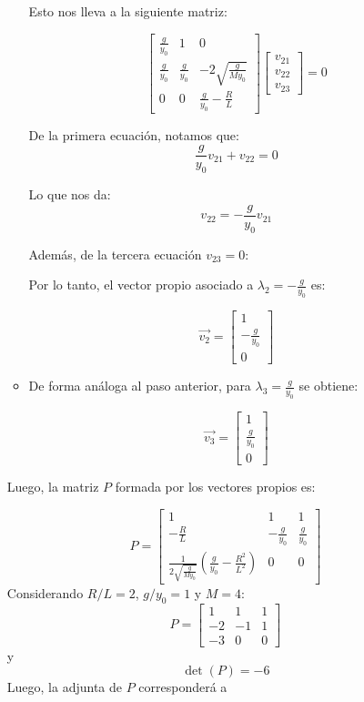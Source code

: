 \begin{enumerate}
\begin{itemize}
Esto nos lleva a la siguiente matriz:

\[
\begin{bmatrix}
\frac{g}{y_0} & 1 & 0 \\
\frac{g}{y_0} & \frac{g}{y_0} & -2\sqrt{\frac{g}{M y_0}} \\
0 & 0 & \frac{g}{y_0} - \frac{R}{L}
\end{bmatrix}
\begin{bmatrix}
v_{21} \\
v_{22} \\
v_{23}
\end{bmatrix}
= 0
\]

De la primera ecuación, notamos que:
\[ \frac{g}{y_0} v_{21} + v_{22} = 0 \]

Lo que nos da:
   \[
   v_{22} = -\frac{g}{y_0} v_{21}
   \]
   
   Además, de la tercera ecuación \(
   v_{23} = 0
   \):
   \[\]

Por lo tanto, el vector propio asociado a \( \lambda_2 = -\frac{g}{y_0} \) es:

\[
\Vec{v_2} = 
\begin{bmatrix}
1 \\
-\frac{g}{y_0} \\
0
\end{bmatrix}
\]

\item De forma análoga al paso anterior, para \( \lambda_3 = \frac{g}{y_0} \) se obtiene:

\[
\Vec{v_3} = 
\begin{bmatrix}
1 \\
\frac{g}{y_0} \\
0
\end{bmatrix}
\]
\end{itemize}
Luego, la matriz \( P \) formada por los vectores propios es:

\[
P = 
\begin{bmatrix}
1 & 1 & 1 \\
-\frac{R}{L} & -\frac{g}{y_0} & \frac{g}{y_0} \\
\frac{1}{2\sqrt{\frac{g}{M y_0}}} \left( \frac{g}{y_0} - \frac{R^2}{L^2} \right) & 0 & 0
\end{bmatrix}
\]
Considerando $R/L=2$, $g/y_0=1$ y $M=4$:
\[
P = 
\begin{bmatrix}
1 & 1 & 1 \\
-2 & -1 & 1 \\
-3 & 0 & 0
\end{bmatrix}
\]
y 
\[
\det(P) = -6
\]
Luego, la adjunta de $P$ corresponderá a


\end{enumerate}
